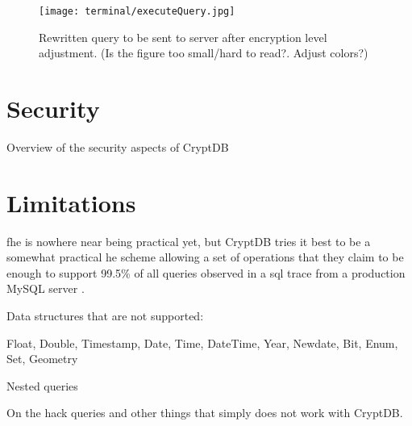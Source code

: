 \begin{figure}[h]
	\texttt{[image: terminal/executeQuery.jpg]}
	\caption{Rewritten query to be sent to server after encryption level adjustment. (Is the figure too small/hard to read?. Adjust colors?)}
	\label{rewritten_query}
\end{figure}


\section{Security}

Overview of the security aspects of CryptDB

\section{Limitations}


\gls{fhe} is nowhere near being practical yet, but CryptDB tries it best to be a somewhat practical \gls{he} scheme allowing a set of operations that they claim to be enough to support 99.5\% of all queries observed in a \gls{sql} trace from a production MySQL server \citep{CryptDB_Main_Paper}. 

Data structures that are not supported:

Float, Double, Timestamp, Date, Time, DateTime, Year, Newdate, Bit, Enum, Set, Geometry

Nested queries

On the hack queries and other things that simply does not work with CryptDB. 